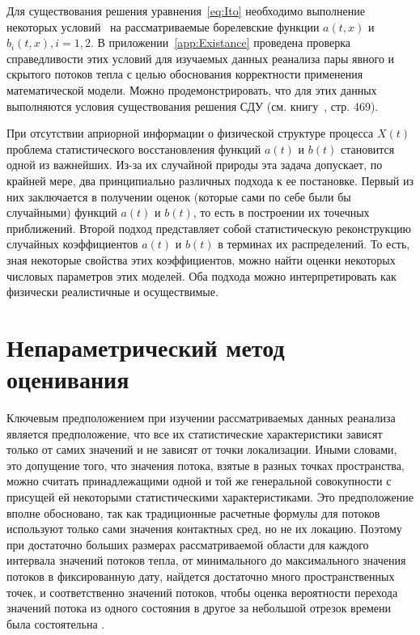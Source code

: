Для существования решения уравнения~\eqref{eq:Ito} необходимо выполнение некоторых условий~\cite{Skorohod} на рассматриваемые борелевские функции $a(t, x)$ и $b_i(t, x), i=1,2$. В приложении~\ref{app:Existance} проведена проверка справедливости этих условий для изучаемых данных реанализа пары явного и скрытого потоков тепла с целью обоснования корректности применения математической модели. Можно продемонстрировать, что для этих данных выполняются условия существования решения СДУ (см. книгу~\cite{Skorohod}, стр. 469). %

При отсутствии априорной информации о физической структуре процесса $X(t)$ проблема статистического восстановления функций $a(t)$ и $b(t)$ становится одной из важнейших. Из-за их случайной природы эта задача допускает, по крайней мере, два принципиально различных подхода к ее постановке. Первый из них заключается в получении оценок (которые сами по себе были бы случайными) функций $a(t)$ и $b(t)$, то есть в построении их точечных приближений. Второй подход представляет собой статистическую реконструкцию случайных коэффициентов $a(t)$ и $b(t)$ в терминах их распределений. То есть, зная некоторые свойства этих коэффициентов, можно найти оценки некоторых числовых параметров этих моделей. Оба подхода можно интерпретировать как физически реалистичные и осуществимые.

\section{Непараметрический метод оценивания}
\label{sec:Nonparametic}
Ключевым предположением при изучении рассматриваемых данных реанализа является предположение, что все их статистические характеристики зависят только от самих значений и не зависят от точки локализации. Иными словами, это допущение того, что значения потока, взятые в разных точках пространства, можно считать принадлежащими одной и той же генеральной совокупности с присущей ей некоторыми статистическими характеристиками. Это предположение вполне обосновано, так как традиционные расчетные формулы для потоков~\cite{cronin2019air,leyba2019trends} используют только сами значения контактных сред, но не их локацию. Поэтому при достаточно больших размерах рассматриваемой области для каждого интервала значений потоков тепла, от минимального до максимального значения потоков в фиксированную дату, найдется достаточно много пространственных точек, и соответственно значений потоков, чтобы оценка вероятности перехода значений потока из одного состояния в другое за небольшой отрезок времени была состоятельна .



